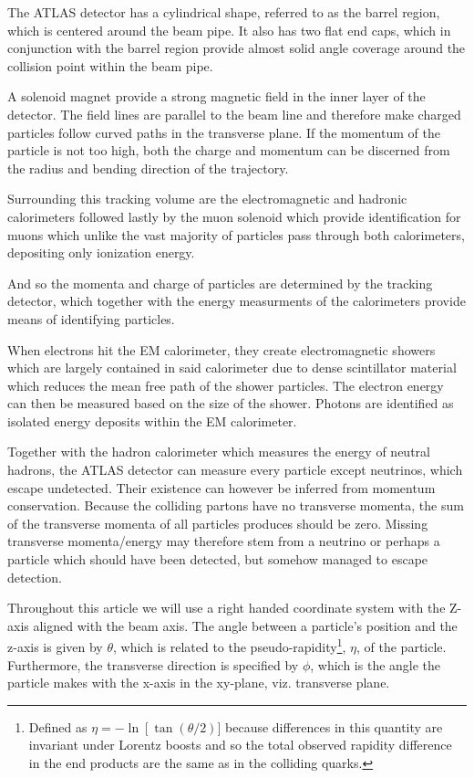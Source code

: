 \documentclass{article}
\begin{document}
\begin{titlepage}
The ATLAS detector has a cylindrical shape, referred to as the barrel region, which is centered around the beam pipe. It also has two flat end caps, which in conjunction with the barrel region provide almost solid angle coverage around the collision point within the beam pipe. 


A solenoid magnet provide a strong magnetic field in the inner layer of the detector. The field lines are parallel to the beam line and therefore make charged particles follow curved paths in the transverse plane. If the momentum of the particle is not too high, both the charge and momentum can be discerned from the radius and bending direction of the trajectory. 

Surrounding this tracking volume are the electromagnetic and hadronic calorimeters followed lastly by the muon solenoid which provide identification for muons which unlike the vast majority of particles pass through both calorimeters, depositing only ionization energy. 

And so the momenta and charge of particles are determined by the tracking detector, which together with the energy measurments of the calorimeters provide means of identifying particles. 

When electrons hit the EM calorimeter, they create electromagnetic showers which are largely contained in said calorimeter due to dense scintillator material which reduces the mean free path of the shower particles. The electron energy can then be measured based on the size of the shower. Photons are identified as isolated energy deposits within the EM calorimeter\cite{Thomson}.  

Together with the hadron calorimeter which measures the energy of neutral hadrons, the ATLAS detector can measure every particle except neutrinos, which escape undetected. Their existence can however be inferred from momentum conservation. Because the colliding partons have no transverse momenta, the sum of the transverse momenta of all particles produces should be zero. Missing transverse momenta/energy may therefore stem from a neutrino or perhaps a particle which should have been detected, but somehow managed to escape detection. 

Throughout this article we will use a right handed coordinate system with the Z-axis aligned with the beam axis. The angle between a particle's position and the z-axis is given by $\theta$, which is related to the pseudo-rapidity\footnote{Defined as $\eta = -\ln \left[\tan(\theta/2)]$ because differences in this quantity are invariant under Lorentz boosts and so the total observed rapidity difference in the end products are the same as in the colliding quarks.}, $\eta$, of the particle. Furthermore, the transverse direction is specified by $\phi$, which is the angle the particle makes with the x-axis in the xy-plane, viz. transverse plane.


\end{titlepage}
\end{document}
